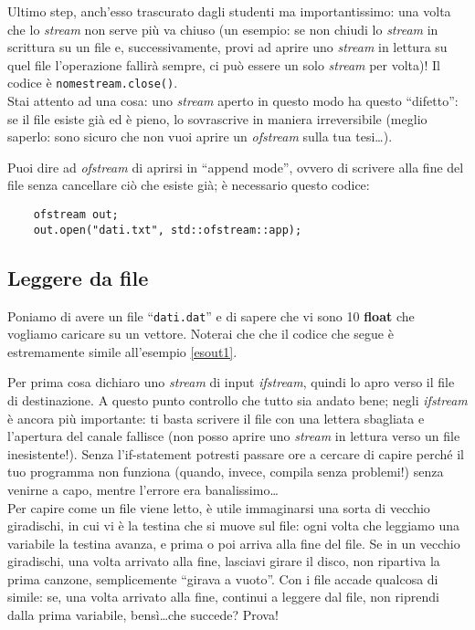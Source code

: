 Ultimo step, anch'esso trascurato dagli studenti ma importantissimo: una volta che  lo \emph{stream} non serve più va chiuso (un esempio: se non chiudi lo \emph{stream} in scrittura su un file e, successivamente, provi ad aprire uno \emph{stream} in lettura su quel file l'operazione fallirà sempre, ci può essere un solo \emph{stream} per volta)! Il codice è \verb|nomestream.close()|. \\

Stai attento ad una cosa: uno \emph{stream} aperto in questo modo ha questo ``difetto'': se il file esiste già ed è pieno, lo sovrascrive in maniera irreversibile (meglio saperlo: sono sicuro che non vuoi aprire un \emph{ofstream} sulla tua tesi\ldots). 

Puoi dire ad \emph{ofstream} di aprirsi in ``append mode'', ovvero di scrivere alla fine del file senza cancellare ciò che esiste già; è necessario questo codice:
\begin{lstlisting}
	ofstream out;
	out.open("dati.txt", std::ofstream::app);
\end{lstlisting}
\subsection{Leggere da file}
Poniamo di avere un file ``\verb|dati.dat|'' e di sapere che vi sono 10 \textbf{float} che vogliamo caricare su un vettore. Noterai che che il codice che segue è estremamente simile all'esempio \ref{esout1}.


Per prima cosa dichiaro uno \emph{stream} di input \emph{ifstream}, quindi lo apro verso il file di destinazione. A questo punto controllo che tutto sia andato bene; negli \emph{ifstream} è ancora più importante: ti basta scrivere il file con una lettera sbagliata e l'apertura del canale fallisce (non posso aprire uno \emph{stream} in lettura verso un file inesistente!). Senza l'if-statement potresti passare ore a cercare di capire perché il tuo programma non funziona (quando, invece, compila senza problemi!) senza venirne a capo, mentre l'errore era banalissimo\ldots \\

Per capire come un file viene letto, è utile immaginarsi una sorta di vecchio giradischi, in cui vi è la testina che si muove sul file: ogni volta che leggiamo una variabile la testina avanza, e prima o poi arriva alla fine del file. Se in un vecchio giradischi, una volta arrivato alla fine, lasciavi girare il disco, non ripartiva la prima canzone, semplicemente ``girava a vuoto''. Con i file accade qualcosa di simile: se, una volta arrivato alla fine, continui a leggere dal file, non riprendi dalla prima variabile, bensì\ldots che succede? Prova!

